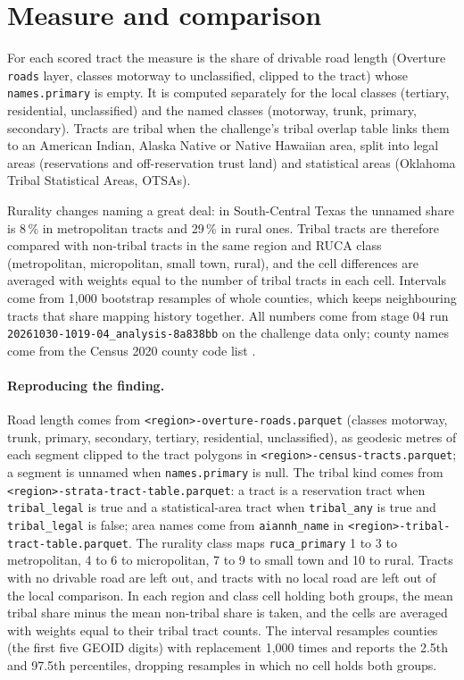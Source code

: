 \documentclass[11pt]{article}
\begin{document}
\section{Measure and comparison}

For each scored tract the measure is the share of drivable road length
(Overture \cite{overture} \texttt{roads} layer, classes motorway to unclassified, clipped to
the tract) whose \texttt{names.primary} is empty. It is computed separately
for the local classes (tertiary, residential, unclassified) and the named
classes (motorway, trunk, primary, secondary). Tracts are tribal when the
challenge's tribal overlap table links them to an American Indian, Alaska
Native or Native Hawaiian area, split into legal areas (reservations and
off-reservation trust land) and statistical areas (Oklahoma Tribal
Statistical Areas, OTSAs).

Rurality changes naming a great deal: in South-Central Texas the unnamed
share is 8\,\% in metropolitan tracts and 29\,\% in rural ones. Tribal tracts
are therefore compared with non-tribal tracts in the same region and RUCA
class \cite{ruca} (metropolitan, micropolitan, small town, rural), and the cell
differences are averaged with weights equal to the number of tribal tracts
in each cell. Intervals come from 1,000 bootstrap resamples of whole
counties, which keeps neighbouring tracts that share mapping history
together. All numbers come from stage 04 run
\texttt{20261030-1019-04\_analysis-8a838bb} on the challenge data only;
county names come from the Census 2020 county code list \cite{countycodes}.

\paragraph{Reproducing the finding.} Road length comes from
\nolinkurl{<region>-overture-roads.parquet} (classes motorway, trunk, primary,
secondary, tertiary, residential, unclassified), as geodesic metres of each
segment clipped to the tract polygons in \nolinkurl{<region>-census-tracts.parquet};
a segment is unnamed when \texttt{names.primary} is null. The tribal kind comes
from \nolinkurl{<region>-strata-tract-table.parquet}: a tract is a reservation
tract when \texttt{tribal\_legal} is true and a statistical-area tract when
\texttt{tribal\_any} is true and \texttt{tribal\_legal} is false; area names come
from \texttt{aiannh\_name} in \nolinkurl{<region>-tribal-tract-table.parquet}. The
rurality class maps \texttt{ruca\_primary} 1 to 3 to metropolitan, 4 to 6 to
micropolitan, 7 to 9 to small town and 10 to rural. Tracts with no drivable
road are left out, and tracts with no local road are left out of the local
comparison. In each region and class cell holding both groups, the mean
tribal share minus the mean non-tribal share is taken, and the cells are
averaged with weights equal to their tribal tract counts. The interval
resamples counties (the first five GEOID digits) with replacement 1,000
times and reports the 2.5th and 97.5th percentiles, dropping resamples in
which no cell holds both groups.
\end{document}
